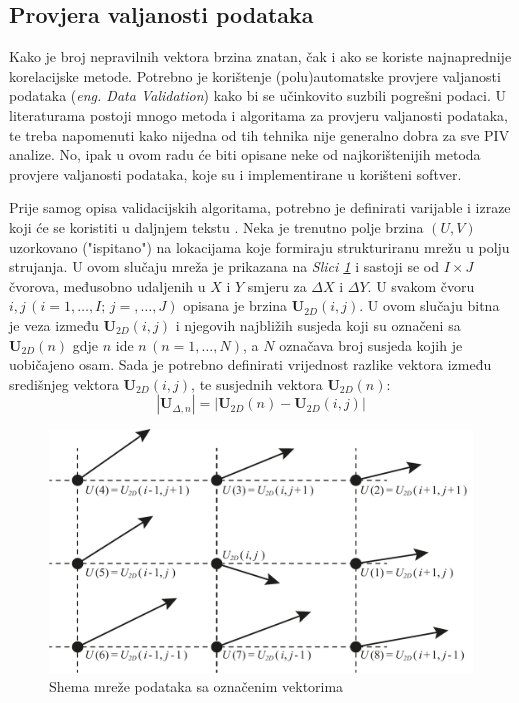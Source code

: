 \subsection{Provjera valjanosti podataka}
Kako je broj nepravilnih vektora brzina znatan, čak i ako se koriste najnaprednije korelacijske metode. Potrebno je korištenje (polu)automatske provjere valjanosti podataka (\textit{eng. Data Validation}) kako bi se učinkovito suzbili pogrešni podaci. U literaturama postoji mnogo metoda i algoritama za provjeru valjanosti podataka, te treba napomenuti kako nijedna od tih tehnika nije generalno dobra za sve PIV analize. No, ipak u ovom radu će biti opisane neke od najkorištenijih metoda provjere valjanosti podataka, koje su i implementirane u korišteni softver.
\par
Prije samog opisa validacijskih algoritama, potrebno je definirati varijable i izraze koji će se koristiti u daljnjem tekstu \cite{raffel2018_book}. Neka je trenutno polje brzina $(U, V)$ uzorkovano ("ispitano") na lokacijama koje formiraju strukturiranu mrežu u polju strujanja.  U ovom slučaju mreža  je prikazana na \textit{Slici \ref{sl:2.13}} i sastoji se od $I\times J$ čvorova, međusobno udaljenih u $X$ i $Y$ smjeru za $\Delta X$ i $\Delta Y$. U svakom čvoru $i, j \, (i=1,\dots ,I;\, j=,\dots ,J)$ opisana je brzina $\boldsymbol{U}_{2D}(i, j)$. U ovom slučaju bitna je veza između $\boldsymbol{U}_{2D}(i, j)$ i njegovih najbližih susjeda koji su označeni sa $\boldsymbol{U}_{2D}(n)$ gdje $n$ ide $n \, (n=1,\dots,N)$, a $N$ označava broj susjeda kojih je uobičajeno osam. Sada je potrebno definirati vrijednost razlike vektora između središnjeg vektora $\boldsymbol{U}_{2D}(i, j)$, te susjednih vektora $\boldsymbol{U}_{2D}(n)$:
\begin{equation}
	|\boldsymbol{U}_{\Delta , n}|=|\boldsymbol{U}_{2D}(n)-\boldsymbol{U}_{2D}(i,j)|
	\label{eqn:2.9}
\end{equation}
\begin{figure}[h]  
	\centering
	\includegraphics[width=12cm]{./2_DPIV/2_13MeshPostProc.pdf} 
	\caption{Shema mreže podataka sa označenim vektorima}
	\label{sl:2.13}
\end{figure}
